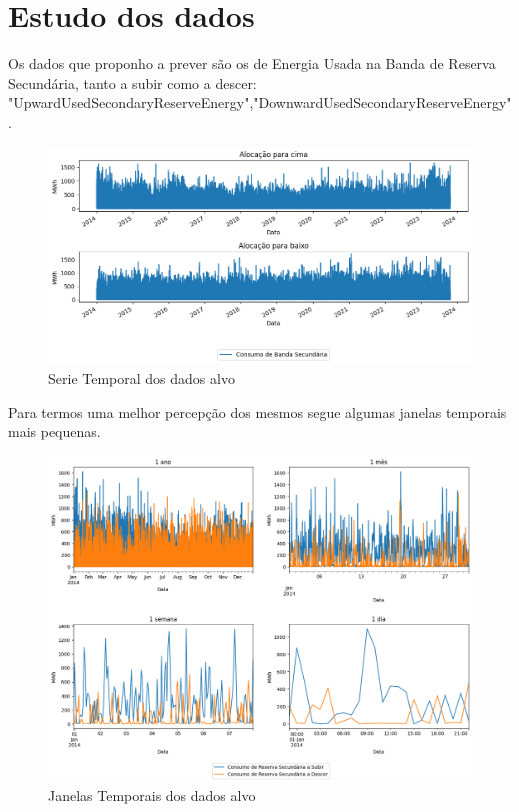 
\section{Estudo dos dados}

Os dados que proponho a prever são os de Energia Usada na Banda de Reserva Secundária, tanto a subir como a descer: "UpwardUsedSecondaryReserveEnergy","DownwardUsedSecondaryReserveEnergy".\\



\begin{figure}[H]
  \centering
  \includegraphics[width=\textwidth]{plots/consumo_originais.png}
  \caption{Serie Temporal dos dados alvo}
  \label{fig:targettimeseries}
\end{figure}


Para termos uma melhor percepção dos mesmos segue algumas janelas temporais mais pequenas.

\begin{figure}[H]
  \centering
  \includegraphics[width=\textwidth]{plots/target_timeseries_windows.png}
  \caption{Janelas Temporais dos dados alvo}
  \label{fig:targettimeserieswindows}
\end{figure}


